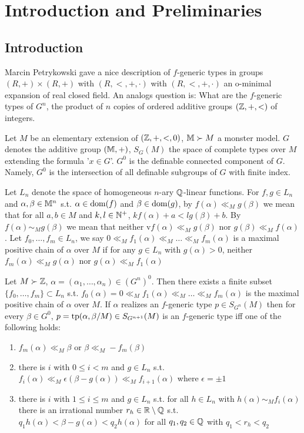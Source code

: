 \documentclass[11pt]{article}
\begin{document}
\section{Introduction and Preliminaries}
\label{sec:org17b72e2}
\subsection{Introduction}
\label{sec:orgc825fae}
Marcin Petrykowski gave a nice description of \(f\)-generic types in groups \((R,+)\times(R,+)\)
with \((R,<,+,\cdot)\) with \((R,<,+,\cdot)\) an o-minimal expansion of real closed field. An analogs
question is: What are the \(f\)-generic types of \(G^n\), the product of \(n\) copies of ordered
additive groups \((\mathbb{Z},+,<)\) of integers.

Let \(M\) be an elementary extension of \((\mathbb{Z},+,<,0)\), \(\mathbb{M}\succ M\) a monster model. \(G\) denotes
the additive group \((\mathbb{M},+)\), \(S_G(M)\) the space of complete types over \(M\) extending the
formula '\(x\in G\)'. \(G^0\) is the definable connected component of \(G\). Namely, \(G^0\) is the
intersection of all definable subgroups of \(G\) with finite index.

Let \(L_n\) denote the space of homogeneous \(n\)-ary \(\mathbb{Q}\)-linear functions. For \(f,g\in L_n\)
and \(\alpha,\beta\in\mathbb{M}^n\) s.t. \(\alpha\in\operatorname{dom}(f)\) and \(\beta\in\operatorname{dom}(g)\), by \(f(\alpha)\ll_Mg(\beta)\) we mean that for
all \(a,b\in M\) and \(k,l\in\mathbb{N}^+\), \(kf(\alpha)+a<lg(\beta)+b\). By \(f(\alpha)\sim_Mg(\beta)\) we mean that
neither v\(f(\alpha)\ll_Mg(\beta)\) nor \(g(\beta)\ll_Mf(\alpha)\). Let \(f_0,\dots,f_m\in L_n\), we
say \(0\ll_Mf_1(\alpha)\ll_M\dots\ll_Mf_m(\alpha)\) is a maximal positive chain of \(\alpha\) over \(M\) if for any \(g\in L_n\)
with \(g(\alpha)>0\), neither \(f_m(\alpha)\ll_Mg(\alpha)\) nor \(g(\alpha)\ll_Mf_1(\alpha)\)

\begin{theorem}[]
Let \(M\succ\mathbb{Z}\), \(\alpha=(\alpha_1,\dots,\alpha_n)\in(G^n)^0\). Then there exists a finite subset \(\{f_0,\dots,f_m\}\subset L_n\)
s.t. \(f_0(\alpha)=0\ll_Mf_1(\alpha)\ll_M\dots\ll_Mf_m(\alpha)\) is the maximal positive chain of \(\alpha\) over \(M\). If \(\alpha\)
realizes an \(f\)-generic type \(p\in S_{G^n}(M)\) then for
every \(\beta\in G^0\), \(p=\operatorname{tp}(\alpha,\beta/M)\in S_{G^{n+1}}(M)\) is an \(f\)-generic type iff one of the
following holds:
\begin{enumerate}
\item \(f_m(\alpha)\ll_M\beta\) or \(\beta\ll_M-f_m(\beta)\)
\item there is \(i\) with \(0\le i<m\) and \(g\in L_n\) s.t. \(f_i(\alpha)\ll_M\epsilon(\beta-g(\alpha))\ll_Mf_{i+1}(\alpha)\)
where \(\epsilon=\pm 1\)
\item there is \(i\) with \(1\le i\le m\) and \(g\in L_n\) s.t. for all \(h\in L_n\) with \(h(\alpha)\sim_Mf_i(\alpha)\)
there is an irrational number \(r_h\in\mathbb{R}\setminus\mathbb{Q}\) s.t. \(q_1h(\alpha)<\beta-g(\alpha)<q_2h(\alpha)\) for all \(q_1,q_2\in\mathbb{Q}\)
with \(q_1<r_h<q_2\)
\end{enumerate}
\end{theorem}
\end{document}
